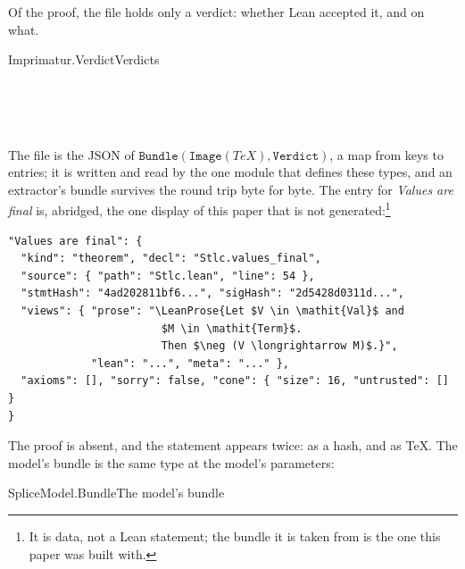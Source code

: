 \documentclass[acmsmall,screen,review,anonymous,nonacm]{acmart}
\begin{document}
Of the proof, the file holds only a verdict: whether Lean accepted it, and
on what.

\begin{leangrammar}[sum=A26C7HIvD7, dflt=OjijLYL1Ju]{Imprimatur.Verdict}{Verdicts}
\label{gram:Imprimatur.Verdict}\begin{LeanDisplay}
\\
\\
\\
\end{LeanDisplay}
\end{leangrammar}

The file is the JSON of $\texttt{Bundle}(\texttt{Image}(\mathit{TeX}),
\texttt{Verdict})$, a map from keys to entries; it is written and read by
the one module that defines these types, and an extractor's bundle survives
the round trip byte for byte. The entry for \emph{Values are final} is,
abridged, the one display of this paper that is not generated:\footnote{It
is data, not a Lean statement; the bundle it is taken from is the one this
paper was built with.}

\begin{footnotesize}
\begin{verbatim}
"Values are final": {
  "kind": "theorem", "decl": "Stlc.values_final",
  "source": { "path": "Stlc.lean", "line": 54 },
  "stmtHash": "4ad202811bf6...", "sigHash": "2d5428d0311d...",
  "views": { "prose": "\LeanProse{Let $V \in \mathit{Val}$ and
                        $M \in \mathit{Term}$.
                        Then $\neg (V \longrightarrow M)$.}",
             "lean": "...", "meta": "..." },
  "axioms": [], "sorry": false, "cone": { "size": 16, "untrusted": [] }
}
\end{verbatim}
\end{footnotesize}

The proof is absent, and the statement appears twice: as a hash, and as
\TeX{}. The model's bundle is the same type at the model's parameters:

\begin{leandef}[sum=w7ghbqB2ku, dflt=URMwEx39ks]{SpliceModel.Bundle}{The model's bundle}
\begin{LeanDisplay}
\end{LeanDisplay}
\end{leandef}
\end{document}

